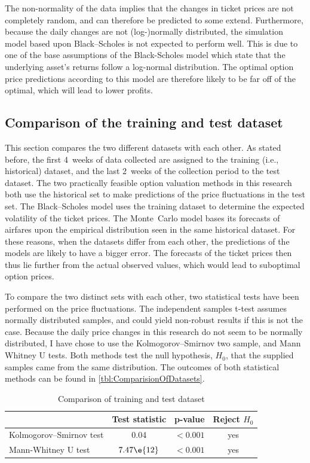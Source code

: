 The non-normality of the data implies that the changes in ticket prices are not completely random, and can therefore be predicted to some extend. Furthermore, because the daily changes are not (log-)normally distributed, the simulation model based upon Black--Scholes is not expected to perform well. This is due to one of the base assumptions of the Black-Scholes model which state that the underlying asset's returns follow a log-normal distribution. The optimal option price predictions according to this model are therefore likely to be far off of the optimal, which will lead to lower profits.

\subsection{Comparison of the training and test dataset}
This section compares the two different datasets with each other. As stated before, the first 4~weeks of data collected are assigned to the training (i.e., historical) dataset, and the last 2~weeks of the collection period to the test dataset. The two practically feasible option valuation methods in this research both use the historical set to make predictions of the price fluctuations in the test set. The Black--Scholes model uses the training dataset to determine the expected volatility of the ticket prices. The Monte~Carlo model bases its forecasts of airfares upon the empirical distribution seen in the same historical dataset. For these reasons, when the datasets differ from each other, the predictions of the models are likely to have a bigger error. The forecasts of the ticket prices then thus lie further from the actual observed values, which would lead to suboptimal option prices.

To compare the two distinct sets with each other, two statistical tests have been performed on the price fluctuations. The independent samples t-test assumes normally distributed samples, and could yield non-robust results if this is not the case. Because the daily price changes in this research do not seem to be normally distributed, I have chose to use the Kolmogorov--Smirnov two sample, and Mann Whitney U tests. Both methods test the null hypothesis, $H_0$, that the supplied samples came from the same distribution.  The outcomes of both statistical methods can be found in \autoref{tbl:ComparisionOfDatasets}.


\begin{table}
\centering
\begin{tabular}{l c c c}
\toprule
~  &  Test statistic  &  p-value  &  Reject $H_0$  \\
\midrule
Kolmogorov--Smirnov test  & 0.04  &  $< 0.001$  & yes \\
Mann-Whitney U test  &  $7.47 \e{12}$ &  $< 0.001$  & yes \\
\bottomrule
\end{tabular}
\caption{Comparison of training and test dataset}
\label{tbl:ComparisionOfDatasets}
\end{table}


